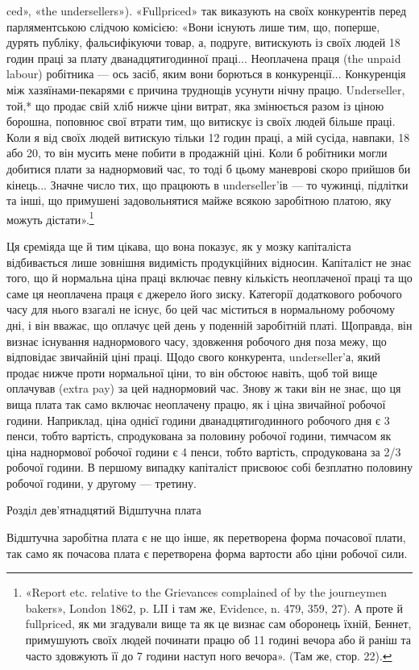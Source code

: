 ced», «the undersellers»). «Fullpriced» так виказують на своїх
конкурентів перед парляментською слідчою комісією: «Вони
існують лише тим, що, поперше, дурять публіку, фальсифікуючи
товар, а, подруге, витискують із своїх людей 18 годин праці
за плату дванадцятигодинної праці... Неоплачена праця (the
unpaid labour) робітника — ось засіб, яким вони борються в
конкуренції... Конкуренція між хазяїнами-пекарями є причина
труднощів усунути нічну працю. Underseller, той,* що продає
свій хліб нижче ціни витрат, яка змінюється разом із ціною
борошна, поповнює свої втрати тим, що витискує із своїх людей
більше праці. Коли я від своїх людей витискую тільки 12 годин
праці, а мій сусіда, навпаки, 18 або 20, то він мусить мене побити
в продажній ціні. Коли б робітники могли добитися плати за
наднормовий час, то тоді б цьому маневрові скоро прийшов би
кінець... Значне число тих, що працюють в underseller’ів — то
чужинці, підлітки та інші, що примушені задовольнятися майже
всякою заробітною платою, яку можуть дістати».\footnote{
«Report etc. relative to the Grievances complained of by the
journeymen bakers», London 1862, p. LII і там же, Evidence, n. 479,
359, 27). А проте й fullpriced, як ми згадували вище та як це визнає сам
оборонець їхній, Беннет, примушують своїх людей починати працю об
11 годині вечора або й раніш та часто здовжують її до 7 години наступ
ного вечора». (Там же, стор. 22).
}

Ця єреміяда ще й тим цікава, що вона показує, як у мозку
капіталіста відбивається лише зовнішня видимість продукційних
відносин. Капіталіст не знає того, що й нормальна ціна праці
включає певну кількість неоплаченої праці та що саме ця неоплачена
праця є джерело його зиску. Категорії додаткового робочого
часу для нього взагалі не існує, бо цей час міститься в нормальному
робочому дні, і він вважає, що оплачує цей день у поденній
заробітній платі. Щоправда, він визнає існування наднормового
часу, здовження робочого дня поза межу, що відповідає звичайній
ціні праці. Щодо свого конкурента, underseller’а, який продає
нижче проти нормальної ціни, то він обстоює навіть, щоб той
вище оплачував (extra pay) за цей наднормовий час. Знову ж
таки він не знає, що ця вища плата так само включає неоплачену
працю, як і ціна звичайної робочої години. Наприклад,
ціна однієї години дванадцятигодинного робочого дня є 3 пенси,
тобто вартість, спродукована за половину робочої години, тимчасом
як ціна наднормової робочої години є 4 пенси, тобто вартість,
спродукована за 2/3 робочої години. В першому випадку капіталіст
присвоює собі безплатно половину робочої години, у
другому — третину.

Розділ дев’ятнадцятий
Відштучна плата

Відштучна заробітна плата є не що інше, як перетворена
форма почасової плати, так само як почасова плата є перетворена
форма вартости або ціни робочої сили.